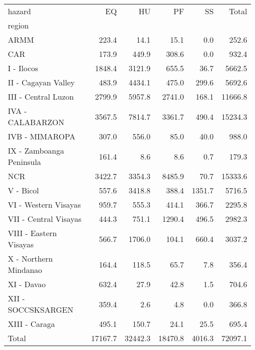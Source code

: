 \begin{tabular}{lrrrrr}
\toprule
hazard &       EQ &       HU &       PF &      SS &    Total \\
region                   &          &          &          &         &          \\
\midrule
ARMM                     &    223.4 &     14.1 &     15.1 &     0.0 &    252.6 \\
CAR                      &    173.9 &    449.9 &    308.6 &     0.0 &    932.4 \\
I - Ilocos               &   1848.4 &   3121.9 &    655.5 &    36.7 &   5662.5 \\
II - Cagayan Valley      &    483.9 &   4434.1 &    475.0 &   299.6 &   5692.6 \\
III - Central Luzon      &   2799.9 &   5957.8 &   2741.0 &   168.1 &  11666.8 \\
IVA - CALABARZON         &   3567.5 &   7814.7 &   3361.7 &   490.4 &  15234.3 \\
IVB - MIMAROPA           &    307.0 &    556.0 &     85.0 &    40.0 &    988.0 \\
IX - Zamboanga Peninsula &    161.4 &      8.6 &      8.6 &     0.7 &    179.3 \\
NCR                      &   3422.7 &   3354.3 &   8485.9 &    70.7 &  15333.6 \\
V - Bicol                &    557.6 &   3418.8 &    388.4 &  1351.7 &   5716.5 \\
VI - Western Visayas     &    959.7 &    555.3 &    414.1 &   366.7 &   2295.8 \\
VII - Central Visayas    &    444.3 &    751.1 &   1290.4 &   496.5 &   2982.3 \\
VIII - Eastern Visayas   &    566.7 &   1706.0 &    104.1 &   660.4 &   3037.2 \\
X - Northern Mindanao    &    164.4 &    118.5 &     65.7 &     7.8 &    356.4 \\
XI - Davao               &    632.4 &     27.9 &     42.8 &     1.5 &    704.6 \\
XII - SOCCSKSARGEN       &    359.4 &      2.6 &      4.8 &     0.0 &    366.8 \\
XIII - Caraga            &    495.1 &    150.7 &     24.1 &    25.5 &    695.4 \\
Total                    &  17167.7 &  32442.3 &  18470.8 &  4016.3 &  72097.1 \\
\bottomrule
\end{tabular}
